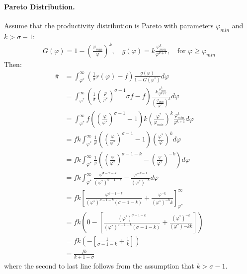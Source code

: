 \begin{solution}
    \paragraph{Pareto Distribution.} Assume that the productivity distribution is Pareto with parameters $\varphi_{min}$ and $k > \sigma - 1$:
    \begin{align*}
        G(\varphi) = 1 - \left( \frac{\varphi_{min}}{\varphi} \right)^k, \quad g(\varphi) = k \frac{\varphi_{min}^k}{\varphi^{k+1}}, \quad \text{for } \varphi \geq \varphi_{min}
    \end{align*}
    Then:
    \begin{align*}
        \bar{\pi} &= \int_{\varphi^*}^{\infty} \left( \frac{1}{\sigma} r(\varphi) - f \right) \frac{g(\varphi)}{1 - G(\varphi^*)} d\varphi \\
        &= \int_{\varphi^*}^{\infty} \left( \frac{1}{\sigma} \left(\frac{\varphi}{\varphi^*}\right)^{\sigma - 1} \sigma f - f \right) \frac{k \frac{\varphi_{min}^k}{\varphi^{k+1}}}{\left( \frac{\varphi_{min}}{\varphi^*} \right)^k} d\varphi \\
        &= \int_{\varphi^*}^{\infty} f \left( \left(\frac{\varphi}{\varphi^*}\right)^{\sigma - 1} - 1 \right) k \left(\frac{\varphi^*}{\varphi_{min}}\right)^k \frac{\varphi_{min}^k}{\varphi^{k+1}} d\varphi \\
        &= f k \int_{\varphi^*}^{\infty} \frac{1}{\varphi}\left( \left(\frac{\varphi}{\varphi^*}\right)^{\sigma - 1} - 1 \right) \left(\frac{\varphi^*}{\varphi}\right)^k d\varphi \\
        &= f k \int_{\varphi^*}^{\infty} \frac{1}{\varphi}\left( \left(\frac{\varphi}{\varphi^*}\right)^{\sigma - 1 - k} - \left(\frac{\varphi}{\varphi^*}\right)^{-k} \right) d\varphi \\
        &= f k \int_{\varphi^*}^{\infty} \frac{\varphi^{\sigma - 2 - k}}{(\varphi^*)^{\sigma - 1 - k}} - \frac{\varphi^{-k - 1}}{(\varphi^*)^{-k}} d\varphi \\
        &= f k \left[ \frac{\varphi^{\sigma - 1 - k}}{(\varphi^*)^{\sigma - 1 - k} (\sigma - 1 - k)} + \frac{\varphi^{-k}}{(\varphi^*)^{-k} k} \right]_{\varphi^*}^{\infty} \\
        &= f k \left( 0 - \left[ \frac{(\varphi^*)^{\sigma - 1 - k}}{(\varphi^*)^{\sigma - 1 - k} (\sigma - 1 - k)} + \frac{(\varphi^*)^{-k}}{(\varphi^*){-k} k} \right] \right) \\
        &= f k \left( - \left[ \frac{1}{\sigma - 1 - k} + \frac{1}{k} \right] \right) \\
        &= \frac{fk}{k + 1 - \sigma}
    \end{align*}
    where the second to last line follows from the assumption that $k > \sigma - 1$.


\end{solution}
